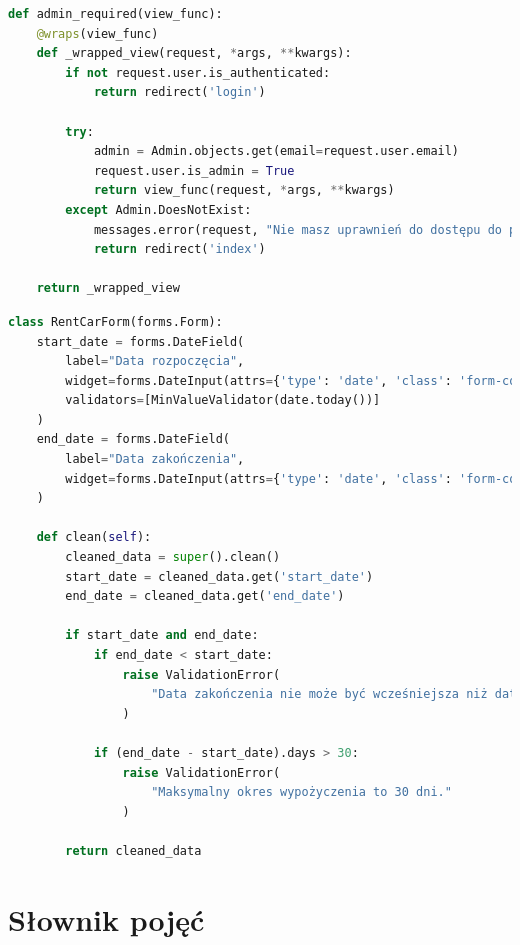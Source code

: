 \documentclass[12pt,a4paper]{article}
\begin{document}
\begin{lstlisting}[language=Python, caption={Dekorator weryfikujący uprawnienia administratora}]
def admin_required(view_func):
    @wraps(view_func)
    def _wrapped_view(request, *args, **kwargs):
        if not request.user.is_authenticated:
            return redirect('login')

        try:
            admin = Admin.objects.get(email=request.user.email)
            request.user.is_admin = True
            return view_func(request, *args, **kwargs)
        except Admin.DoesNotExist:
            messages.error(request, "Nie masz uprawnień do dostępu do panelu administracyjnego.")
            return redirect('index')
    
    return _wrapped_view
\end{lstlisting}

\begin{lstlisting}[language=Python, caption={Walidacja danych formularza}]
class RentCarForm(forms.Form):
    start_date = forms.DateField(
        label="Data rozpoczęcia",
        widget=forms.DateInput(attrs={'type': 'date', 'class': 'form-control'}),
        validators=[MinValueValidator(date.today())]
    )
    end_date = forms.DateField(
        label="Data zakończenia",
        widget=forms.DateInput(attrs={'type': 'date', 'class': 'form-control'})
    )
    
    def clean(self):
        cleaned_data = super().clean()
        start_date = cleaned_data.get('start_date')
        end_date = cleaned_data.get('end_date')
        
        if start_date and end_date:
            if end_date < start_date:
                raise ValidationError(
                    "Data zakończenia nie może być wcześniejsza niż data rozpoczęcia."
                )
            
            if (end_date - start_date).days > 30:
                raise ValidationError(
                    "Maksymalny okres wypożyczenia to 30 dni."
                )
        
        return cleaned_data
\end{lstlisting}

\newpage

\section{Słownik pojęć}
\end{document}
